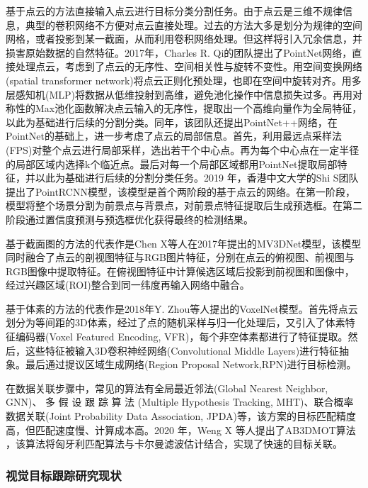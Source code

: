 基于点云的方法直接输入点云进行目标分类分割任务。由于点云是三维不规律信息，典型的卷积网络不方便对点云直接处理。过去的方法大多是划分为规律的空间网格，或者投影到某一截面，从而利用卷积网络处理。但这样将引入冗余信息，并损害原始数据的自然特征。2017年，Charles R. Qi的团队提出了PointNet网络\cite{qi2017pointnet}，直接处理点云，考虑到了点云的无序性、空间相关性与旋转不变性。用空间变换网络(spatial transformer network)将点云正则化预处理，也即在空间中旋转对齐。用多层感知机(MLP)将数据从低维投射到高维，避免池化操作中信息损失过多。再用对称性的Max池化函数解决点云输入的无序性，提取出一个高维向量作为全局特征，以此为基础进行后续的分割分类。同年，该团队还提出PointNet++网络\cite{qi2017pointnet++}，在PointNet的基础上，进一步考虑了点云的局部信息。首先，利用最远点采样法(FPS)对整个点云进行局部采样，选出若干个中心点。再为每个中心点在一定半径的局部区域内选择k个临近点。最后对每一个局部区域都用PointNet提取局部特征，并以此为基础进行后续的分割分类任务。2019 年，香港中文大学的Shi S团队提出了PointRCNN模型\cite{shi2019pointrcnn}，该模型是首个两阶段的基于点云的网络。在第一阶段，模型将整个场景分割为前景点与背景点，对前景点特征提取后生成预选框。在第二阶段通过置信度预测与预选框优化获得最终的检测结果。

基于截面图的方法的代表作是Chen X等人在2017年提出的MV3DNet模型\cite{chen2017multi}，该模型同时融合了点云的剖视图特征与RGB图片特征，分别在点云的俯视图、前视图与RGB图像中提取特征。在俯视图特征中计算候选区域后投影到前视图和图像中，经过兴趣区域(ROI)整合到同一纬度再输入网络中融合。

基于体素的方法的代表作是2018年Y. Zhou等人提出的VoxelNet模型\cite{zhou2018voxelnet}。首先将点云划分为等间距的3D体素，经过了点的随机采样与归一化处理后，又引入了体素特征编码器(Voxel Featured Encoding, VFR)，每个非空体素都进行了特征提取。然后，这些特征被输入3D卷积神经网络(Convolutional Middle Layers)进行特征抽象。最后通过提议区域生成网络(Region Proposal Network,RPN)进行目标检测。

在数据关联步骤中，常见的算法有全局最近邻法(Global Nearest Neighbor, GNN)、 多 假 设 跟 踪 算 法 (Multiple Hypothesis Tracking, MHT)、联合概率数据关联(Joint Probability Data Association, JPDA)等，该方案的目标匹配精度高，但匹配速度慢、计算成本高。2020 年，Weng X 等人提出了AB3DMOT算法\cite{weng2020ab3dmot} \cite{weng20203d}，该算法将匈牙利匹配算法与卡尔曼滤波估计结合，实现了快速的目标关联。

\subsubsection{视觉目标跟踪研究现状}

